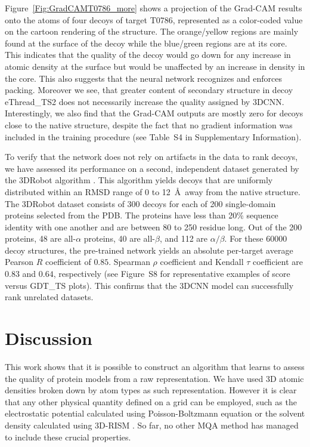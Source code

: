 \documentclass{bioinfo}
\begin{document}
Figure~\ref{Fig:GradCAMT0786_more} shows a projection of the Grad-CAM
results onto the atoms of four decoys of target T0786, represented as
a color-coded value on the cartoon rendering of the structure.  The
orange/yellow regions are mainly found at the surface of the decoy
while the blue/green regions are at its core. This indicates that the
quality of the decoy would go down for any increase in atomic density
at the surface but would be unaffected by an increase in density in
the core. This also suggests that the neural network recognizes and
enforces packing. Moreover we see, that greater content of secondary 
structure in decoy eThread\_TS2 does not necessarily increase the quality assigned by 3DCNN. 
Interestingly, we also find that the Grad-CAM
outputs are mostly zero for decoys close to the native structure,
despite the fact that no gradient information was included in the
training procedure (see Table~S4 in Supplementary Information).

To verify that the network does not rely on artifacts in the data to
rank decoys, we have assessed its performance on a second, independent
dataset generated by the 3DRobot algorithm \citep{deng20163drobot}.
This algorithm yields decoys that are uniformly distributed within an
RMSD range of 0 to 12~\AA\ away from the native structure.
%
The 3DRobot dataset consists of 300 decoys for each of 200
single-domain proteins selected from the PDB. The proteins have less
than 20\% sequence identity with one another and are between 80 to 250
residue long. Out of the 200 proteins, 48 are all-$\alpha$ proteins,
40 are all-$\beta$, and 112 are $\alpha/\beta$.
%
For these 60000 decoy structures, the pre-trained network yields an
absolute per-target average Pearson $R$ coefficient of $0.85$.
Spearman $\rho$ coefficient and Kendall $\tau$ coefficient are $0.83$
and $0.64$, respectively (see Figure~S8 for representative examples of
score versus GDT\_TS plots). This confirms that the 3DCNN model
can successfully rank unrelated datasets.


\section{Discussion}

This work shows that it is possible to construct an algorithm that
learns to assess the quality of protein models from a raw
representation. We have used 3D atomic densities broken down by atom
types as such representation. However it is clear that any other
physical quantity defined on a grid can be employed, such as the
electrostatic potential calculated using Poisson-Boltzmann equation
\citep{honig95} or the solvent density calculated using 3D-RISM
\citep{stumpe2011}. So far, no other MQA method has managed
to include these crucial properties.
\end{document}
